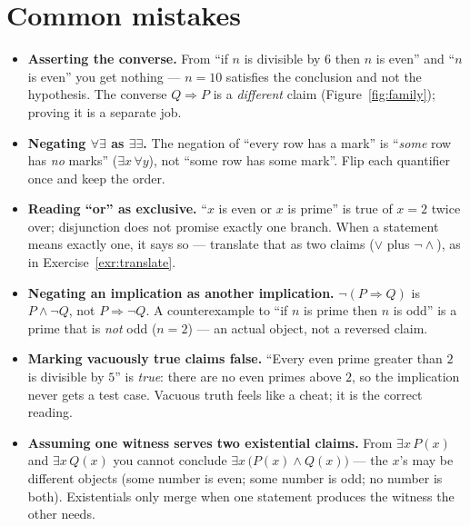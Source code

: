 \section{Common mistakes}
\begin{itemize}
\item \textbf{Asserting the converse.} From ``if $n$ is divisible by $6$ then $n$ is
even'' and ``$n$ is even'' you get nothing --- $n=10$ satisfies the conclusion and
not the hypothesis. The converse $Q\Rightarrow P$ is a \emph{different} claim
(Figure~\ref{fig:family}); proving it is a separate job.
\item \textbf{Negating $\forall\exists$ as $\exists\exists$.} The negation of
``every row has a mark'' is ``\emph{some} row has \emph{no} marks''
($\exists x\,\forall y$), not ``some row has some mark''. Flip each quantifier once
and keep the order.
\item \textbf{Reading ``or'' as exclusive.} ``$x$ is even or $x$ is prime'' is true
of $x=2$ twice over; disjunction does not promise exactly one branch. When a
statement means exactly one, it says so --- translate that as two claims
($\lor$ plus $\lnot\land$), as in Exercise~\ref{exr:translate}.
\item \textbf{Negating an implication as another implication.}
$\lnot(P\Rightarrow Q)$ is $P\land\lnot Q$, not $P\Rightarrow\lnot Q$. A
counterexample to ``if $n$ is prime then $n$ is odd'' is a prime that is
\emph{not} odd ($n=2$) --- an actual object, not a reversed claim.
\item \textbf{Marking vacuously true claims false.} ``Every even prime greater
than $2$ is divisible by $5$'' is \emph{true}: there are no even primes above
$2$, so the implication never gets a test case. Vacuous truth feels like a
cheat; it is the correct reading.
\item \textbf{Assuming one witness serves two existential claims.}
From $\exists x\,P(x)$ and $\exists x\,Q(x)$ you cannot conclude
$\exists x\,\bigl(P(x)\land Q(x)\bigr)$ --- the $x$'s may be different objects
(some number is even; some number is odd; no number is both). Existentials
only merge when one statement produces the witness the other needs.
\end{itemize}

